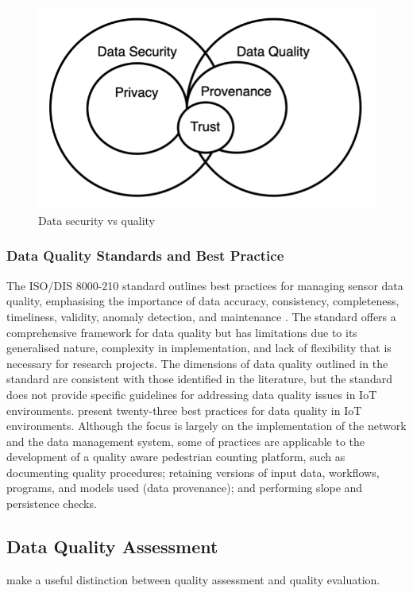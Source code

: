 \begin{figure}[h]
    \centering
    \includegraphics[]{figures/literature_review/dq_security_vs_quality.png}
    \caption{Data security vs quality}
    \label{fig:dq_security_vs_quality}
\end{figure}

\subsubsection{Data Quality Standards and Best Practice}
The ISO/DIS 8000-210 standard outlines best practices for managing sensor data quality, emphasising the importance of data accuracy, consistency, completeness, timeliness, validity, anomaly detection, and maintenance \citep{isoISODIS80002102023}. The standard offers a comprehensive framework for data quality but has limitations due to its generalised nature, complexity in implementation, and lack of flexibility that is necessary for research projects. The dimensions of data quality outlined in the standard are consistent with those identified in the literature, but the standard does not provide specific guidelines for addressing data quality issues in IoT environments. \cite{perez-castilloDataQualityBest2018a} present twenty-three best practices for data quality in IoT environments. Although the focus is largely on the implementation of the network and the data management system, some of practices are applicable to the development of a quality aware pedestrian counting platform, such as documenting quality procedures; retaining versions of input data, workflows, programs, and models used (data provenance); and performing slope and persistence checks.

\subsection{Data Quality Assessment} \label{ssec:data_quality_assessment}
\cite{immonenEvaluatingQualitySocial2015} make a useful distinction between quality assessment and quality evaluation.

